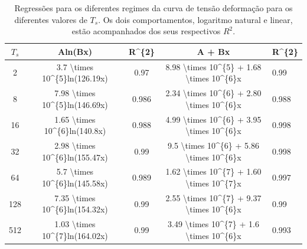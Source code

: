 \documentclass{report}
\begin{document}
        \begin{table}[H]
            \begin{tabular}{ccccl}
            \caption{Regressões para os diferentes regimes da curva de tensão deformação para os diferentes valores de \(T_{s}\).
            Os dois comportamentos, logaritmo natural e linear, estão acompanhados dos seus respectivos \(R^{2}\).}
            \hline
            \textbf{$T_{s}$} & \textbf{Aln(Bx)}                                                & \textbf{R\textasciicircum{}\{2\}} & \textbf{A + Bx}                                                                                              & R\textasciicircum{}\{2\} \\ \hline
            2                & 3.7 \textbackslash{}times 10\textasciicircum{}\{5\}ln(126.19x)  & 0.97                              & 8.98 \textbackslash{}times 10\textasciicircum{}\{5\} + 1.68 \textbackslash{}times 10\textasciicircum{}\{6\}x & 0.99                     \\
            8                & 7.98 \textbackslash{}times 10\textasciicircum{}\{5\}ln(146.69x) & 0.986                             & 2.34 \textbackslash{}times 10\textasciicircum{}\{6\} + 2.80 \textbackslash{}times 10\textasciicircum{}\{6\}x & 0.988                    \\
            16               & 1.65 \textbackslash{}times 10\textasciicircum{}\{6\}ln(140.8x)  & 0.988                             & 4.99 \textbackslash{}times 10\textasciicircum{}\{6\} + 3.95 \textbackslash{}times 10\textasciicircum{}\{6\}x & 0.998                    \\
            32               & 2.98 \textbackslash{}times 10\textasciicircum{}\{6\}ln(155.47x) & 0.99                              & 9.5 \textbackslash{}times 10\textasciicircum{}\{6\} + 5.86 \textbackslash{}times 10\textasciicircum{}\{6\}x  & 0.998                    \\
            64               & 5.7 \textbackslash{}times 10\textasciicircum{}\{6\}ln(145.58x)  & 0.989                             & 1.62 \textbackslash{}times 10\textasciicircum{}\{7\} + 1.60 \textbackslash{}times 10\textasciicircum{}\{7\}x & 0.997                    \\
            128              & 7.35 \textbackslash{}times 10\textasciicircum{}\{6\}ln(154.32x) & 0.99                              & 2.55 \textbackslash{}times 10\textasciicircum{}\{7\} + 9.37 \textbackslash{}times 10\textasciicircum{}\{6\}x & 0.99                     \\
            512              & 1.03 \textbackslash{}times 10\textasciicircum{}\{7\}ln(164.02x) & 0.99                              & 3.49 \textbackslash{}times 10\textasciicircum{}\{7\} + 1.6 \textbackslash{}times 10\textasciicircum{}\{6\}x  & 0.993                    \\

\end{tabular}
\end{table}
\end{document}

